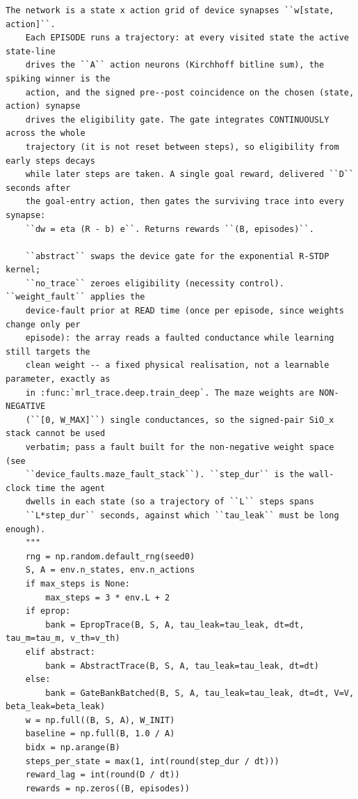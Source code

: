 \begin{lstlisting}[caption={mrl\_trace/maze.py},label={lst:siox-src-maze}]
    The network is a state x action grid of device synapses ``w[state, action]``.
    Each EPISODE runs a trajectory: at every visited state the active state-line
    drives the ``A`` action neurons (Kirchhoff bitline sum), the spiking winner is the
    action, and the signed pre--post coincidence on the chosen (state, action) synapse
    drives the eligibility gate. The gate integrates CONTINUOUSLY across the whole
    trajectory (it is not reset between steps), so eligibility from early steps decays
    while later steps are taken. A single goal reward, delivered ``D`` seconds after
    the goal-entry action, then gates the surviving trace into every synapse:
    ``dw = eta (R - b) e``. Returns rewards ``(B, episodes)``.

    ``abstract`` swaps the device gate for the exponential R-STDP kernel;
    ``no_trace`` zeroes eligibility (necessity control). ``weight_fault`` applies the
    device-fault prior at READ time (once per episode, since weights change only per
    episode): the array reads a faulted conductance while learning still targets the
    clean weight -- a fixed physical realisation, not a learnable parameter, exactly as
    in :func:`mrl_trace.deep.train_deep`. The maze weights are NON-NEGATIVE
    (``[0, W_MAX]``) single conductances, so the signed-pair SiO_x stack cannot be used
    verbatim; pass a fault built for the non-negative weight space (see
    ``device_faults.maze_fault_stack``). ``step_dur`` is the wall-clock time the agent
    dwells in each state (so a trajectory of ``L`` steps spans
    ``L*step_dur`` seconds, against which ``tau_leak`` must be long enough).
    """
    rng = np.random.default_rng(seed0)
    S, A = env.n_states, env.n_actions
    if max_steps is None:
        max_steps = 3 * env.L + 2
    if eprop:
        bank = EpropTrace(B, S, A, tau_leak=tau_leak, dt=dt, tau_m=tau_m, v_th=v_th)
    elif abstract:
        bank = AbstractTrace(B, S, A, tau_leak=tau_leak, dt=dt)
    else:
        bank = GateBankBatched(B, S, A, tau_leak=tau_leak, dt=dt, V=V, beta_leak=beta_leak)
    w = np.full((B, S, A), W_INIT)
    baseline = np.full(B, 1.0 / A)
    bidx = np.arange(B)
    steps_per_state = max(1, int(round(step_dur / dt)))
    reward_lag = int(round(D / dt))
    rewards = np.zeros((B, episodes))


\end{lstlisting}
